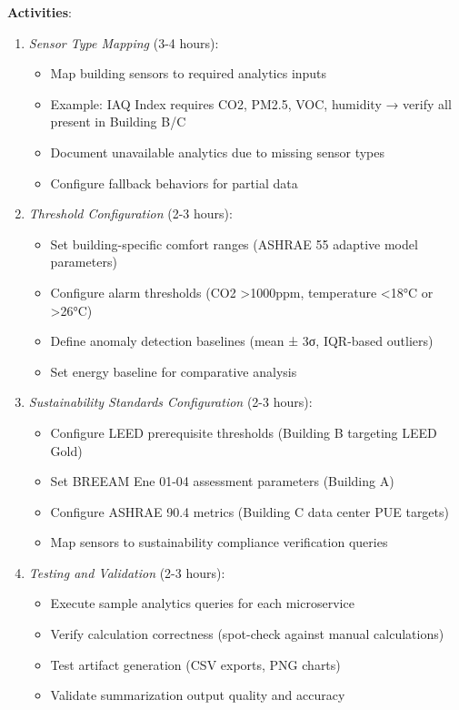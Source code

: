 \documentclass[acmlarge]{acmart}
\begin{document}
\textbf{Activities}:
\begin{enumerate}
    \item \textit{Sensor Type Mapping} (3-4 hours):
    \begin{itemize}
        \item Map building sensors to required analytics inputs
        \item Example: IAQ Index requires CO2, PM2.5, VOC, humidity → verify all present in Building B/C
        \item Document unavailable analytics due to missing sensor types
        \item Configure fallback behaviors for partial data
    \end{itemize}
    
    \item \textit{Threshold Configuration} (2-3 hours):
    \begin{itemize}
        \item Set building-specific comfort ranges (ASHRAE 55 adaptive model parameters)
        \item Configure alarm thresholds (CO2 >1000ppm, temperature <18°C or >26°C)
        \item Define anomaly detection baselines (mean ± 3σ, IQR-based outliers)
        \item Set energy baseline for comparative analysis
    \end{itemize}
    
    \item \textit{Sustainability Standards Configuration} (2-3 hours):
    \begin{itemize}
        \item Configure LEED prerequisite thresholds (Building B targeting LEED Gold)
        \item Set BREEAM Ene 01-04 assessment parameters (Building A)
        \item Configure ASHRAE 90.4 metrics (Building C data center PUE targets)
        \item Map sensors to sustainability compliance verification queries
    \end{itemize}
    
    \item \textit{Testing and Validation} (2-3 hours):
    \begin{itemize}
        \item Execute sample analytics queries for each microservice
        \item Verify calculation correctness (spot-check against manual calculations)
        \item Test artifact generation (CSV exports, PNG charts)
        \item Validate summarization output quality and accuracy
    \end{itemize}
\end{enumerate}
\end{document}
